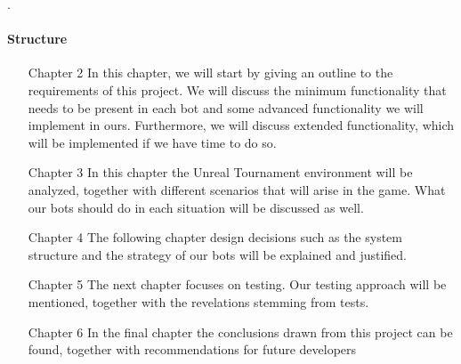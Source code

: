 .

\paragraph{Structure}


\begin{enumerate}
\item[Chapter 2] In this chapter, we will start by giving an outline to the requirements of this project. We will discuss the minimum functionality that needs to be present in each bot and some advanced functionality we will implement in ours. Furthermore, we will discuss extended functionality, which will be implemented if we have time to do so.

\item[Chapter 3] In this chapter the Unreal Tournament environment will be analyzed, together with different scenarios that will arise in the game. What our bots should do in each situation will be discussed as well.

\item[Chapter 4] The following chapter design decisions such as the system structure and the strategy of our bots will be explained and justified.

\item[Chapter 5] The next chapter focuses on testing. Our testing approach will be mentioned, together with the revelations stemming from tests.

\item[Chapter 6] In the final chapter the conclusions drawn from this project can be found, together with recommendations for future developers
\end{enumerate}